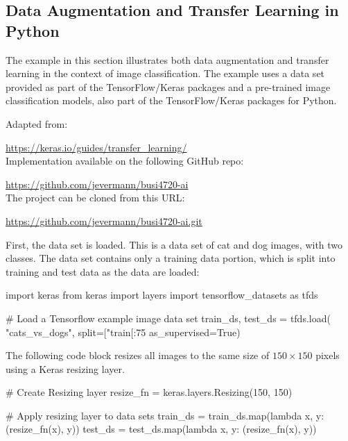 \begin{withcode}
\section{Data Augmentation and Transfer Learning in Python}

The example in this section illustrates both data augmentation and transfer learning in the context of image classification. The example uses a data set provided as part of the TensorFlow/Keras packages and a pre-trained image classification models, also part of the TensorFlow/Keras packages for Python. 

\begin{resourcebox}
Adapted from: 

\small\url{https://keras.io/guides/transfer_learning/}\normalsize \\

Implementation available on the following GitHub repo:

\small\url{https://github.com/jevermann/busi4720-ai}\normalsize \\

The project can be cloned from this URL:

\small\url{https://github.com/jevermann/busi4720-ai.git}\normalsize
\end{resourcebox}

First, the data set is loaded. This is a data set of cat and dog images, with two classes. The data set contains only a training data portion, which is split into training and test data as the data are loaded:

\begin{pythoncode}
import keras
from keras import layers
import tensorflow_datasets as tfds

# Load a Tensorflow example image data set
train_ds, test_ds = tfds.load(
    "cats_vs_dogs",
    split=["train[:75%
    as_supervised=True)
\end{pythoncode}

The following code block resizes all images to the same size of $150 \times 150$ pixels using a Keras resizing layer.
\begin{pythoncode}
# Create Resizing layer
resize_fn = keras.layers.Resizing(150, 150)

# Apply resizing layer to data sets
train_ds = train_ds.map(lambda x, y: (resize_fn(x), y))
test_ds = test_ds.map(lambda x, y: (resize_fn(x), y))
\end{pythoncode}


\end{withcode}
